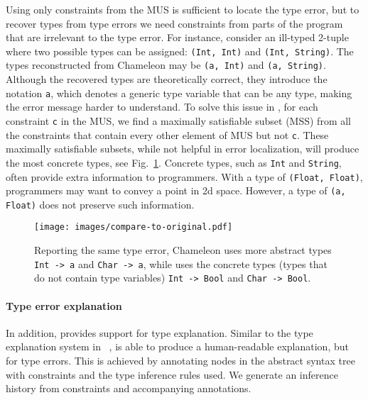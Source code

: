 Using only constraints from the MUS is sufficient to locate the type error, but to recover types from type errors we need constraints from parts of the program that are irrelevant to the type error.  For instance, consider an ill-typed 2-tuple where two possible types can be assigned: \texttt{(Int, Int)} and \texttt{(Int, String)}. The types reconstructed from Chameleon may be \texttt{(a, Int)} and \texttt{(a, String)}. Although the recovered types are theoretically correct, they introduce the notation \texttt{a}, which denotes a generic type variable that can be any type, making the error message harder to understand. To solve this issue in \chameleon{}, for each constraint \texttt{c} in the MUS, we find a maximally satisfiable subset (MSS) from all the constraints that contain every other element of MUS but not \texttt{c}. These maximally satisfiable subsets, while not helpful in error localization, will produce the most concrete types, see Fig.~\ref{fig:compare-to-original}. Concrete types, such as \texttt{Int} and \texttt{String},  often provide extra information to programmers. With a type of \texttt{(Float, Float)}, programmers may want to convey a point in 2d space. However, a type of \texttt{(a, Float)} does not preserve such information.


\begin{figure}[ht]
    \centering
    \texttt{[image: images/compare-to-original.pdf]}
    \caption[Comparison between original Chameleon and \chameleon{}]{
Reporting the same type error, Chameleon uses more abstract types
\texttt{Int -> a} and \texttt{Char -> a}, while \chameleon{} uses the 
concrete types (types that do not contain type variables) \texttt{Int -> Bool} and \texttt{Char -> Bool}.
    }
    \label{fig:compare-to-original}
\end{figure}

 


\paragraph{Type error explanation}

In addition, \chameleon{} provides support for type explanation. Similar to the type explanation system  in ~\cite{Jun2002-xp},  \chameleon{} is able to produce a human-readable explanation, but for type errors. This is achieved by annotating nodes in the abstract syntax tree with constraints and the type inference rules used. We generate an inference history from constraints and accompanying annotations. 


